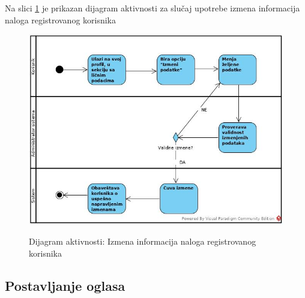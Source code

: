 \documentclass[20pt]{article}
\begin{document}
\setlength{\parindent}{1cm}
\fontsize{13}{18} \selectfont 
Na slici \ref{fig:dijagramAktivnostiIzmenaNaloga} je prikazan dijagram aktivnosti za slu\v{c}aj upotrebe izmena informacija naloga registrovanog korisnika

\begin{figure}[h]
		\centering
		\includegraphics[width=1.1\textwidth,height=0.74\textheight]{Pictures/IzmenaInformacijaNalogaKorisnika.jpg}\\
		\caption{Dijagram aktivnosti: Izmena informacija naloga registrovanog korisnika}
		\label{fig:dijagramAktivnostiIzmenaNaloga}
	\end{figure}
	
\newpage
\subsection{\bfseries \Large Postavljanje oglasa}
\setlength{\parindent}{1cm}
\fontsize{13}{18} \selectfont 
\end{document}
